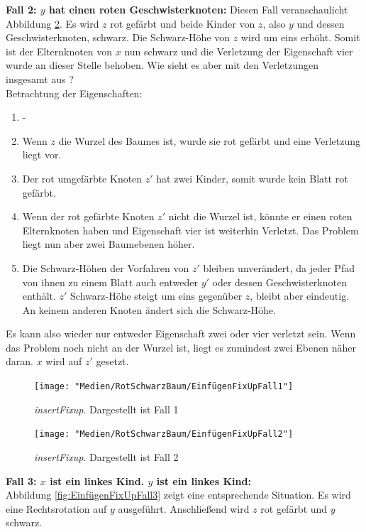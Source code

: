 \documentclass[a4paper,12pt]{article}
\begin{document}
\noindent\textbf{Fall 2: $y$ hat einen roten Geschwisterknoten: }
\noindent Diesen Fall veranschaulicht Abbildung \ref{fig:EinfügenFixUpFall2}. Es wird $z$ rot gefärbt und beide Kinder von $z$, also $y$ und dessen Geschwisterknoten, schwarz. Die Schwarz-Höhe von $z$ wird um eins erhöht. Somit ist der Elternknoten von $x$ nun schwarz und die Verletzung der Eigenschaft vier wurde an dieser Stelle behoben. Wie sieht es aber mit den Verletzungen insgesamt aus ? \\

Betrachtung der Eigenschaften:

\begin{enumerate}
	\item -
	\item Wenn $z$ die Wurzel des Baumes ist, wurde sie rot gefärbt und eine Verletzung liegt vor.
	\item Der rot umgefärbte Knoten $z'$ hat zwei Kinder, somit wurde kein Blatt rot gefärbt.
	\item  Wenn der rot gefärbte Knoten $z'$ nicht die Wurzel ist, könnte er einen roten Elternknoten haben und Eigenschaft vier ist weiterhin Verletzt. Das Problem liegt nun aber zwei Baumebenen höher.
	\item  Die Schwarz-Höhen der Vorfahren von $z'$ bleiben unverändert, da jeder Pfad von ihnen zu einem Blatt auch entweder $y'$ oder dessen Geschwisterknoten enthält. $z'$ Schwarz-Höhe steigt um eins gegenüber $z$, bleibt aber eindeutig. An keinem anderen Knoten ändert sich die Schwarz-Höhe. 
	
\end{enumerate} 
Es kann also wieder nur entweder Eigenschaft zwei oder vier verletzt sein. Wenn das Problem noch nicht an der Wurzel ist, liegt es zumindest zwei Ebenen näher daran. $x$ wird auf $z'$ gesetzt. 
\begin{figure}[H]
	\centering
	\texttt{[image: "Medien/RotSchwarzBaum/EinfügenFixUpFall1"]}
	\caption{\textit{insertFixup}. Dargestellt ist Fall 1  }
	\label{fig:EinfügenFixUpFall1}
\end{figure}
\begin{figure}[h]
	\centering
	\texttt{[image: "Medien/RotSchwarzBaum/EinfügenFixUpFall2"]}
	\caption{\textit{insertFixup}. Dargestellt ist Fall 2  }
	\label{fig:EinfügenFixUpFall2}
\end{figure}

\noindent\textbf{Fall 3: $x$ ist ein linkes Kind. $y$ ist ein linkes Kind: }\\
\noindent Abbildung \ref{fig:EinfügenFixUpFall3} zeigt eine entsprechende Situation. Es wird eine Rechtsrotation auf $y$ ausgeführt. Anschließend wird $z$ rot gefärbt und $y$ schwarz. \\
\end{document}
